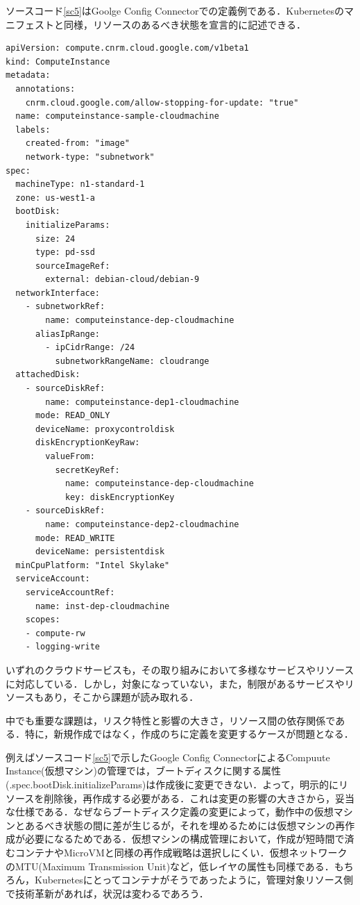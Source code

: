 \documentclass[12pt,a4j]{ujreport}
\begin{document}
ソースコード\ref{sc5}はGoolge Config Connectorでの定義例である．Kubernetesのマニフェストと同様，リソースのあるべき状態を宣言的に記述できる．

\newpage
\begin{lstlisting}[caption=Google Config Connectorの定義例(ComputeInstance),label=sc5]
apiVersion: compute.cnrm.cloud.google.com/v1beta1
kind: ComputeInstance
metadata:
  annotations:
    cnrm.cloud.google.com/allow-stopping-for-update: "true"
  name: computeinstance-sample-cloudmachine
  labels:
    created-from: "image"
    network-type: "subnetwork"
spec:
  machineType: n1-standard-1
  zone: us-west1-a
  bootDisk:
    initializeParams:
      size: 24
      type: pd-ssd
      sourceImageRef:
        external: debian-cloud/debian-9
  networkInterface:
    - subnetworkRef:
        name: computeinstance-dep-cloudmachine
      aliasIpRange:
        - ipCidrRange: /24
          subnetworkRangeName: cloudrange
  attachedDisk:
    - sourceDiskRef:
        name: computeinstance-dep1-cloudmachine
      mode: READ_ONLY
      deviceName: proxycontroldisk
      diskEncryptionKeyRaw:
        valueFrom:
          secretKeyRef:
            name: computeinstance-dep-cloudmachine
            key: diskEncryptionKey
    - sourceDiskRef:
        name: computeinstance-dep2-cloudmachine
      mode: READ_WRITE
      deviceName: persistentdisk
  minCpuPlatform: "Intel Skylake"
  serviceAccount:
    serviceAccountRef:
      name: inst-dep-cloudmachine
    scopes:
    - compute-rw
    - logging-write
\end{lstlisting}

いずれのクラウドサービスも，その取り組みにおいて多様なサービスやリソースに対応している．しかし，対象になっていない，また，制限があるサービスやリソースもあり，そこから課題が読み取れる．

中でも重要な課題は，リスク特性と影響の大きさ，リソース間の依存関係である．特に，新規作成ではなく，作成のちに定義を変更するケースが問題となる．

例えばソースコード\ref{sc5}で示したGoogle Config ConnectorによるCompuute Instance(仮想マシン)の管理では，ブートディスクに関する属性(.spec.bootDisk.initializeParams)は作成後に変更できない．よって，明示的にリソースを削除後，再作成する必要がある．これは変更の影響の大きさから，妥当な仕様である．なぜならブートディスク定義の変更によって，動作中の仮想マシンとあるべき状態の間に差が生じるが，それを埋めるためには仮想マシンの再作成が必要になるためである．仮想マシンの構成管理において，作成が短時間で済むコンテナやMicroVMと同様の再作成戦略は選択しにくい．仮想ネットワークのMTU(Maximum Transmission Unit)など，低レイヤの属性も同様である．もちろん，Kubernetesにとってコンテナがそうであったように，管理対象リソース側で技術革新があれば，状況は変わるであろう．
\end{document}
